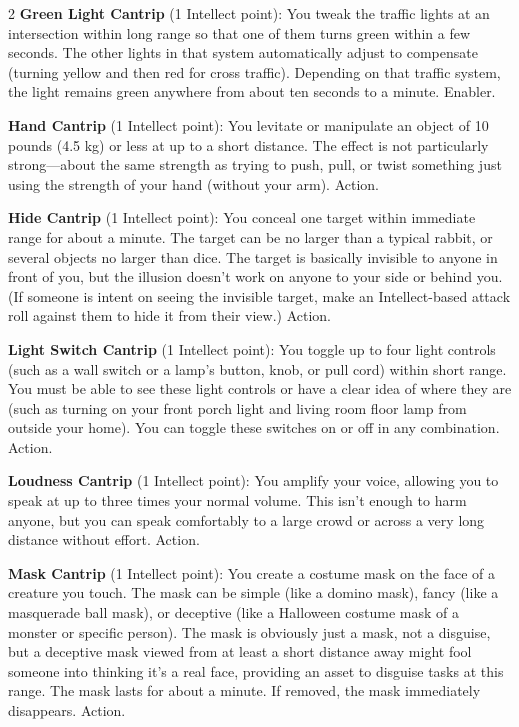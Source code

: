 \begin{multicols}{2}
\textbf{Green Light Cantrip} (1 Intellect point): You tweak the traffic lights at an intersection within long range so that one of them turns green within a few seconds. The other lights in that system automatically adjust to compensate (turning yellow and then red for cross traffic). Depending on that traffic system, the light remains green anywhere from about ten seconds to a minute. Enabler. 

\textbf{Hand Cantrip} (1 Intellect point): You levitate or manipulate an object of 10 pounds (4.5 kg) or less at up to a short distance. The effect is not particularly strong—about the same strength as trying to push, pull, or twist something just using the strength of your hand (without your arm). Action. 

\textbf{Hide Cantrip} (1 Intellect point): You conceal one target within immediate range for about a minute. The target can be no larger than a typical rabbit, or several objects no larger than dice. The target is basically invisible to anyone in front of you, but the illusion doesn’t work on anyone to your side or behind you. (If someone is intent on seeing the invisible target, make an Intellect-based attack roll against them to hide it from their view.) Action. 

\textbf{Light Switch Cantrip} (1 Intellect point): You toggle up to four light controls (such as a wall switch or a lamp’s button, knob, or pull cord) within short range. You must be able to see these light controls or have a clear idea of where they are (such as turning on your front porch light and living room floor lamp from outside your home). You can toggle these switches on or off in any combination. Action. 

\textbf{Loudness Cantrip} (1 Intellect point): You amplify your voice, allowing you to speak at up to three times your normal volume. This isn’t enough to harm anyone, but you can speak comfortably to a large crowd or across a very long distance without effort. Action. 

\textbf{Mask Cantrip} (1 Intellect point): You create a costume mask on the face of a creature you touch. The mask can be simple (like a domino mask), fancy (like a masquerade ball mask), or deceptive (like a Halloween costume mask of a monster or specific person). The mask is obviously just a mask, not a disguise, but a deceptive mask viewed from at least a short distance away might fool someone into thinking it’s a real face, providing an asset to disguise tasks at this range. The mask lasts for about a minute. If removed, the mask immediately disappears. Action. 


\end{multicols}
